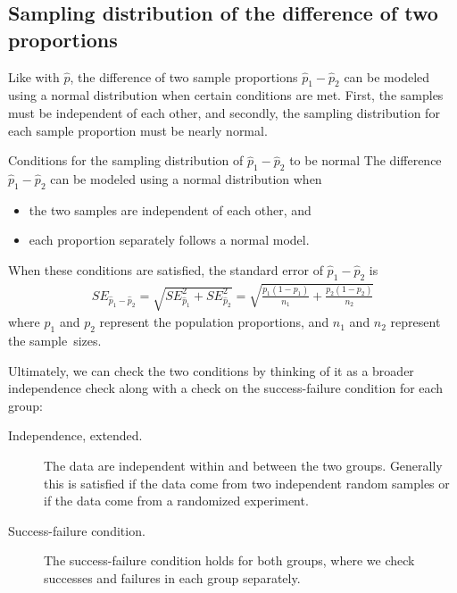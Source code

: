 \subsection{Sampling distribution of the difference
    of two proportions}

Like with $\hat{p}$, the difference of two sample
proportions $\hat{p}_1 - \hat{p}_2$ can be modeled
using a normal distribution when certain conditions
are met.
First, the samples must be independent of each other,
and secondly, the sampling distribution for each sample
proportion must be nearly normal.

\begin{onebox}{Conditions for the
    sampling distribution of $\hat{p}_1 - \hat{p}_2$
    to be normal}
  The difference $\hat{p}_1 - \hat{p}_2$ can be modeled
  using a normal distribution when
  \begin{itemize}
  \setlength{\itemsep}{0mm}
  \item the two samples are independent of each other, and
  \item each proportion separately follows a normal model.
  \end{itemize}
  When these conditions are satisfied,
  the standard error of $\hat{p}_1 - \hat{p}_2$ is
  \begin{eqnarray*}
  SE_{\hat{p}_1 - \hat{p}_2}
    = \sqrt{SE_{\hat{p}_1}^2 + SE_{\hat{p}_2}^2}
    = \sqrt{\frac{p_1(1-p_1)}{n_1} + \frac{p_2(1-p_2)}{n_2}}
  \label{seForDiffOfProp}
  \end{eqnarray*}
  where $p_1$ and $p_2$ represent the population proportions,
  and $n_1$ and $n_2$ represent the sample~sizes.
\end{onebox}

Ultimately, we can check the two conditions by
thinking of it as a broader independence check
along with a check on the success-failure condition
for each group:
\begin{description}
\item[Independence, extended.]
    The data are independent within and between
    the two groups.
    Generally this is satisfied if the data come
    from two independent random samples
    or if the data come from a randomized experiment.
\item[Success-failure condition.]
    The success-failure condition holds for both
    groups, where we check successes and failures
    in each group separately.
\end{description}

